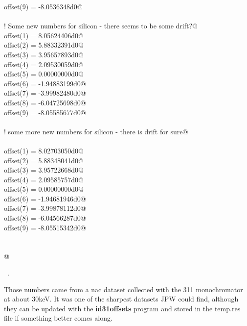 \documentclass[10pt,a4paper,notitlepage]{article}
\newcommand{\code}[1]{\textbf{\textsf{#1}}} %
\begin{document}
\begin{flushleft}
\begin{minipage}{\linewidth}
\begin{list}{}{}
\mbox{}\verb@      offset(9) = -8.0536348d0@\\
\mbox{}\verb@@\\
\mbox{}\verb@ ! Some new numbers for silicon - there seems to be some drift?@\\
\mbox{}\verb@      offset(1) = 8.05624406d0@\\
\mbox{}\verb@      offset(2) = 5.88332391d0@\\
\mbox{}\verb@      offset(3) = 3.95657893d0@\\
\mbox{}\verb@      offset(4) = 2.09530059d0@\\
\mbox{}\verb@      offset(5) = 0.00000000d0@\\
\mbox{}\verb@      offset(6) = -1.94883199d0@\\
\mbox{}\verb@      offset(7) = -3.99982480d0@\\
\mbox{}\verb@      offset(8) = -6.04725698d0@\\
\mbox{}\verb@      offset(9) = -8.05585677d0@\\
\mbox{}\verb@@\\
\mbox{}\verb@! some more new numbers for silicon - there is drift for sure@\\
\mbox{}\verb@@\\
\mbox{}\verb@      offset(1) =  8.02703050d0@\\
\mbox{}\verb@      offset(2) =  5.88348041d0@\\
\mbox{}\verb@      offset(3) =  3.95722668d0@\\
\mbox{}\verb@      offset(4) =  2.09585757d0@\\
\mbox{}\verb@      offset(5) =  0.00000000d0@\\
\mbox{}\verb@      offset(6) = -1.94681946d0@\\
\mbox{}\verb@      offset(7) = -3.99878112d0@\\
\mbox{}\verb@      offset(8) = -6.04566287d0@\\
\mbox{}\verb@      offset(9) = -8.05515342d0@\\
\mbox{}\verb@@\\
\mbox{}\verb@@\\
\mbox{}\verb@                                                                            @{\NWsep}
\end{list}
\vspace{-1.5ex}
\footnotesize
\begin{list}{}{\setlength{\itemsep}{-\parsep}\setlength{\itemindent}{-\leftmargin}}
\item \NWtxtMacroRefIn\ .

\item{}
\end{list}
\end{minipage}\vspace{4ex}
\end{flushleft}
Those numbers came from a nac dataset collected with the 311 monochromator at
about 30keV. It was one of the sharpest datasets JPW could find, although 
they can be updated with the \code{id31offsets} program and stored in the 
temp.res file if something better comes along. 
\end{document}
